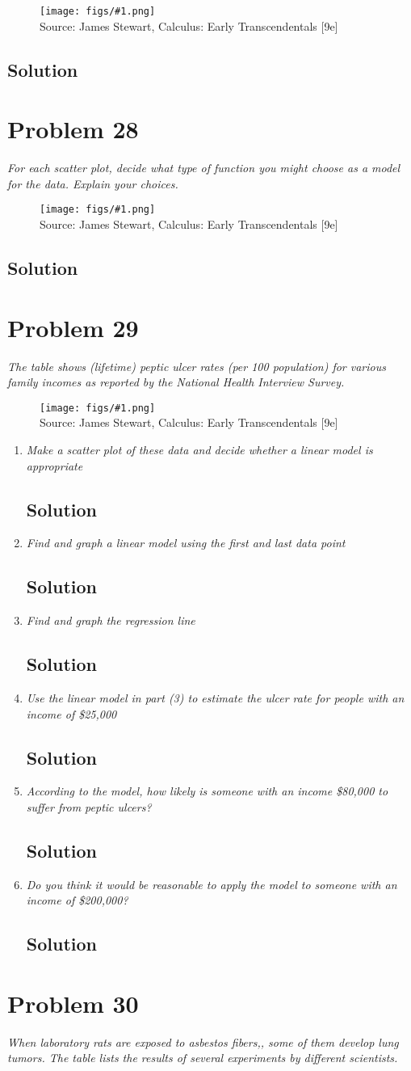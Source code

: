 \documentclass[11pt]{article}
\newcommand{\soln}{\subsection*}
\newcommand{\qn}{\textit}
\newcommand{\imagesource}[1]{{\footnotesize Source: #1}}
\newcommand{\imgqn}[1]{
	\begin{figure}[H]
		\centering
		\texttt{[image: figs/\#1.png]}\\
		\imagesource{James Stewart, Calculus: Early Transcendentals [9e]}
	\end{figure}
}
\begin{document}
\imgqn{1.2.27}

\soln{Solution}

\section*{Problem 28}

\qn{For each scatter plot, decide what type of function you might choose as a model for the data. Explain your choices.}

\imgqn{1.2.28}

\soln{Solution}

\section*{Problem 29}

\qn{The table shows (lifetime) peptic ulcer rates (per 100 population) for various family incomes as reported by the National Health Interview Survey.}

\imgqn{1.2.29}

\begin{enumerate}
	\item \qn{Make a scatter plot of these data and decide whether a linear model is appropriate}
	\soln{Solution}
	
	\item \qn{Find and graph a linear model using the first and last data point}
	\soln{Solution}
	
	\item \qn{Find and graph the regression line}
	\soln{Solution}
	
	\item \qn{Use the linear model in part (3) to estimate the ulcer rate for people with an income of \$25,000}
	\soln{Solution}
	
	\item \qn{According to the model, how likely is someone with an income \$80,000 to suffer from peptic ulcers?}
	\soln{Solution}
	
	\item \qn{Do you think it would be reasonable to apply the model to someone with an income of \$200,000?}
	\soln{Solution}
\end{enumerate}

\section*{Problem 30}

\qn{When laboratory rats are exposed to asbestos fibers,, some of them develop lung tumors. The table lists the results of several experiments by different scientists.}
\end{document}
